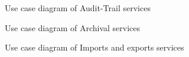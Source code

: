 \documentclass[12pt]{article}
\begin{document}
\begin{figure}[H]
\centering	
{}
\caption{Use case diagram of Audit-Trail services}
\end{figure}

\begin{figure}[H]
\centering	
{}
\caption{Use case diagram of Archival services}
\end{figure}

\begin{figure}[H]
\centering	
{}
\caption{Use case diagram of Imports and exports services}
\end{figure}
\end{document}
